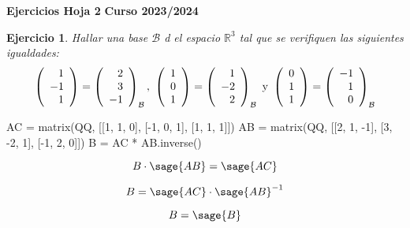 \documentclass{amsart}
\newtheorem{ejer}{Ejercicio}
\def\r{\mathbb{R}}
\begin{document}
\begin{center}
\textrm{ \bf {Ejercicios Hoja 2}}
\vskip 0.3cm
\textrm{ \bf {Curso 2023/2024} }
\end{center}


\begin{ejer} Hallar una base $\mathcal{B}$ d el espacio $\r ^3$ tal que se verifiquen las siguientes igualdades:
\[ \left( \begin{array}{r}
1 \\ -1 \\ 1             
\end{array} \right) = \left( \begin{array}{r}
2 \\ 3 \\ -1       
\end{array} \right)_{\mathcal{B}}, \ \left( \begin{array}{r}
1 \\ 0 \\ 1             
\end{array} \right) = \left( \begin{array}{r}
1 \\ -2 \\ 2       
\end{array} \right)_{\mathcal{B}}  \hbox{ y } \left( \begin{array}{r}
0 \\ 1 \\ 1             
\end{array} \right) = \left( \begin{array}{r}
-1 \\ 1 \\ 0       
\end{array} \right)_{\mathcal{B}} \]
\end{ejer}

\begin{sageblock}
	AC = matrix(QQ, [[1, 1, 0], [-1, 0, 1], [1, 1, 1]])
	AB = matrix(QQ, [[2, 1, -1], [3, -2, 1], [-1, 2, 0]])
	B = AC * AB.inverse()
\end{sageblock}

$$
	B \cdot \sage{AB} = \sage{AC}
$$

$$
	B = \sage{AC} \cdot {\sage{AB}}^{-1}
$$

$$
	B = \sage{B}
$$
\end{document}
